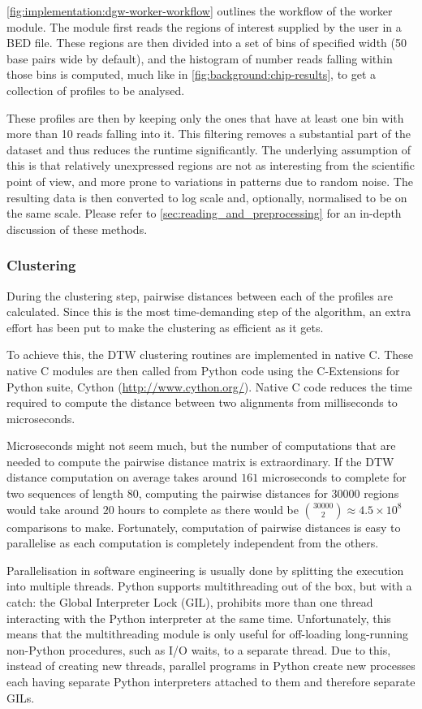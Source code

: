 \documentclass[parskip]{cs4rep}
\begin{document}
\autoref{fig:implementation:dgw-worker-workflow} outlines the workflow of the worker module.
The module first reads the regions of interest supplied by the user in a BED file. These regions are then divided into a set of bins of specified width (50 base pairs wide by default), and the histogram of number reads falling within those bins is computed, much like in \autoref{fig:background:chip-results}, to get a collection of profiles to be analysed. 

These profiles are then by keeping only the ones that have at least one bin with more than 10 reads falling into it. This filtering removes a substantial part of the dataset and thus reduces the runtime significantly. The underlying assumption of this is that relatively unexpressed regions are not as interesting from the scientific point of view, and more prone to variations in patterns due to random noise. The resulting data is then converted to log scale and, optionally, normalised to be on the same scale. Please refer to \autoref{sec:reading_and_preprocessing} for an in-depth discussion of these methods.

\subsubsection{Clustering}
During the clustering step, pairwise distances between each of the profiles are calculated.
Since this is the most time-demanding step of the algorithm, an extra effort has been put to make the clustering as efficient as it gets. 

To achieve this, the DTW clustering routines are implemented in native C. These native C modules are then called from Python code using the C-Extensions for Python suite, Cython (\url{http://www.cython.org/}). Native C code reduces the time required to compute the distance between two alignments from milliseconds to microseconds.

Microseconds might not seem much, but the number of computations that are needed to compute the pairwise distance matrix is extraordinary. If the DTW distance computation on average takes around $161$ microseconds to complete for two sequences of length 80, computing the pairwise distances for $30000$ regions would take around $20$ hours to complete as there would be ${30000 \choose 2} \approx 4.5 \times 10^8$ comparisons to make. Fortunately, computation of pairwise distances is easy to parallelise as each computation is completely independent from the others.

Parallelisation in software engineering is usually done by splitting the execution into multiple threads.
Python supports multithreading out of the box, but with a catch: the Global Interpreter Lock (GIL), prohibits more than one thread interacting with the Python interpreter at the same time. Unfortunately, this means that the multithreading module is only useful for off-loading long-running non-Python procedures, such as I/O waits, to a separate thread. Due to this, instead of creating new threads, parallel programs in Python create new processes each having separate Python interpreters attached to them and therefore separate GILs.
\end{document}

